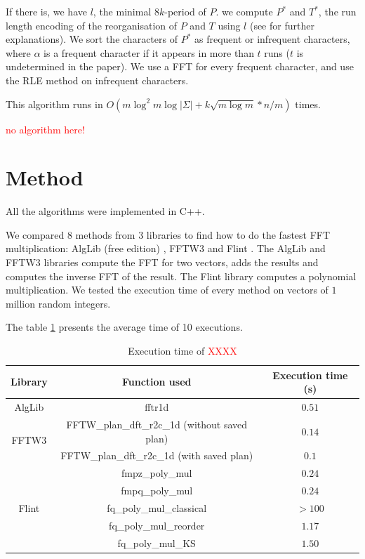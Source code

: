 \documentclass[preprint,12pt]{elsarticle}
\begin{document}
If there is, we have $l$, the minimal $8k$-period of $P$.
we compute $P^*$ and $T^*$, the run length encoding of the reorganisation of $P$ and $T$ using $l$
(see \cite{Kmism3} for further explanations).
We sort the characters of $P^*$ as frequent or infrequent characters,
where $\alpha$ is a frequent character if it appears in more than $t$ runs
($t$ is undetermined in the paper).
We use a FFT for every frequent character,
and use the RLE method on infrequent characters.

This algorithm runs in $O(m \log^2 m \log |\Sigma| +k \sqrt{m \log m} * n/m)$ times.


\textcolor{red}{no algorithm here!}

\section{Method}
\label{Method}

All the algorithms were implemented in C++.

We compared $8$ methods from $3$ libraries to find how to do the fastest FFT multiplication:
AlgLib (free edition) \cite{alglib}, FFTW3 \cite{FFTW05} and Flint \cite{Hart2010}.
The AlgLib and FFTW3 libraries compute the FFT for two vectors,
adds the results and computes the inverse FFT of the result.
The Flint library computes a polynomial multiplication.
We tested the execution time of every method on vectors of $1$ million random integers.

The table \ref{tempsFFT} presents the average time of 10 executions.


\begin{table}[h]
\label{tempsFFT}
\begin{tabular}{|c|c|c|}
\hline
Library 				& Function used 							& Execution time (s) \\ \hline
AlgLib 					& fftr1d 									& $0.51$ \\ \hline
\multirow{2}{*}{FFTW3} 	& FFTW\_plan\_dft\_r2c\_1d (without saved plan) & $0.14$ \\
						& FFTW\_plan\_dft\_r2c\_1d (with saved plan) 	& $0.1$ \\ \hline
\multirow{5}{*}{Flint} 	& fmpz\_poly\_mul 							& $0.24$ \\
						& fmpq\_poly\_mul 							& $0.24$ \\
						& fq\_poly\_mul\_classical 					& $> 100$ \\
						& fq\_poly\_mul\_reorder 						& $1.17$ \\
						& fq\_poly\_mul\_KS 							& $1.50$ \\ \hline
\end{tabular}
\caption{Execution time of \textcolor{red}{XXXX}}
\end{table}
\end{document}
